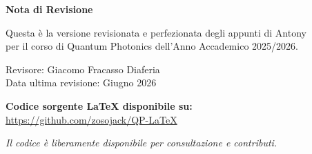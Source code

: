 \thispagestyle{empty}
\vspace*{\fill}
\begin{center}
    \large
    \textbf{Nota di Revisione}
    
    \vspace{1cm}

    Questa è la versione revisionata e perfezionata degli appunti di Antony\\
    per il corso di Quantum Photonics dell'Anno Accademico 2025/2026.

    \vspace{0.5cm}
    
    Revisore: Giacomo Fracasso Diaferia \\
    Data ultima revisione: Giugno 2026
    
    \vspace{1cm}
    
    \textbf{Codice sorgente LaTeX disponibile su:} \\
    \url{https://github.com/zosojack/QP-LaTeX}
    
    \vspace{0.3cm}
    
    \small
    \textit{Il codice è liberamente disponibile per consultazione e contributi.}
\end{center}
\vspace*{\fill}
\clearpage